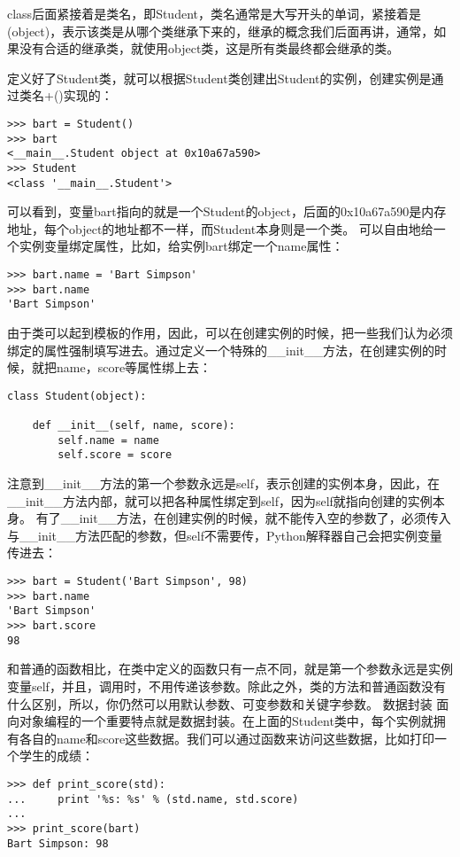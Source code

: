 \documentclass[twoside,11pt]{book}
\begin{document}
class后面紧接着是类名，即Student，类名通常是大写开头的单词，紧接着是(object)，表示该类是从哪个类继承下来的，继承的概念我们后面再讲，通常，如果没有合适的继承类，就使用object类，这是所有类最终都会继承的类。


定义好了Student类，就可以根据Student类创建出Student的实例，创建实例是通过类名+()实现的：
\begin{lstlisting}
>>> bart = Student()
>>> bart
<__main__.Student object at 0x10a67a590>
>>> Student
<class '__main__.Student'>
\end{lstlisting}

可以看到，变量bart指向的就是一个Student的object，后面的0x10a67a590是内存地址，每个object的地址都不一样，而Student本身则是一个类。
可以自由地给一个实例变量绑定属性，比如，给实例bart绑定一个name属性：
\begin{lstlisting}
>>> bart.name = 'Bart Simpson'
>>> bart.name
'Bart Simpson'
\end{lstlisting}

由于类可以起到模板的作用，因此，可以在创建实例的时候，把一些我们认为必须绑定的属性强制填写进去。通过定义一个特殊的\_\_init\_\_方法，在创建实例的时候，就把name，score等属性绑上去：
\begin{lstlisting}
class Student(object):

    def __init__(self, name, score):
        self.name = name
        self.score = score
\end{lstlisting}

注意到\_\_init\_\_方法的第一个参数永远是self，表示创建的实例本身，因此，在\_\_init\_\_方法内部，就可以把各种属性绑定到self，因为self就指向创建的实例本身。
有了\_\_init\_\_方法，在创建实例的时候，就不能传入空的参数了，必须传入与\_\_init\_\_方法匹配的参数，但self不需要传，Python解释器自己会把实例变量传进去：
\begin{lstlisting}
>>> bart = Student('Bart Simpson', 98)
>>> bart.name
'Bart Simpson'
>>> bart.score
98
\end{lstlisting}

和普通的函数相比，在类中定义的函数只有一点不同，就是第一个参数永远是实例变量self，并且，调用时，不用传递该参数。除此之外，类的方法和普通函数没有什么区别，所以，你仍然可以用默认参数、可变参数和关键字参数。
数据封装
面向对象编程的一个重要特点就是数据封装。在上面的Student类中，每个实例就拥有各自的name和score这些数据。我们可以通过函数来访问这些数据，比如打印一个学生的成绩：
\begin{lstlisting}
>>> def print_score(std):
...     print '%s: %s' % (std.name, std.score)
...
>>> print_score(bart)
Bart Simpson: 98
\end{lstlisting}
\end{document}
